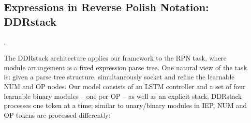 \documentclass{article}
\begin{document}
\subsection{Expressions in Reverse Polish Notation: DDRstack}
\begin{table*}
  \small
  \centering
  \renewcommand{\arraystretch}{1.2}
\renewcommand{\tabcolsep}{1.2mm}
  \caption{Accuracy on all CLEVR question types for baselines and competitive models. The Human baseline is from the original CLEVR work. * denotes additional program supervision. SA refers to stacked spatial attention \cite{DBLP:journals/corr/YangHGDS15}}. 

  \label{tab:fullclevr}
\end{table*}
The DDRstack architecture applies our framework to the RPN task, where module arrangement is a fixed expression parse tree. One natural view of the task is: given a parse tree structure, simultaneously socket and refine the learnable NUM and OP nodes. Our model consists of an LSTM controller and a set of four learnable binary modules -- one per OP -- as well as an explicit stack. DDRstack processes one token at a time; similar to unary/binary modules in IEP, NUM and OP tokens are processed differently:
\end{document}
